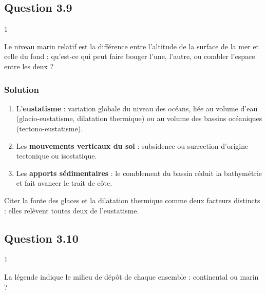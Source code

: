 \documentclass[11pt,a4paper]{article}
\providecommand{\tightlist}{\setlength{\itemsep}{0pt}\setlength{\parskip}{0pt}}
\begin{document}
\hypertarget{question-3.9}{%
\subsection{Question 3.9}\label{question-3.9}}

\begin{indication}{1}

Le niveau marin relatif est la différence entre l'altitude de la surface de la mer et celle du fond : qu'est-ce qui peut faire bouger l'une, l'autre, ou combler l'espace entre les deux ?

\end{indication}

\hypertarget{solution-36}{%
\subsubsection{Solution}\label{solution-36}}

\begin{enumerate}
\def\labelenumi{\arabic{enumi}.}
\tightlist
\item
  L'\textbf{eustatisme} : variation globale du niveau des océans, liée au volume d'eau (glacio-eustatisme, dilatation thermique) ou au volume des bassins océaniques (tectono-eustatisme).
\item
  Les \textbf{mouvements verticaux du sol} : subsidence ou surrection d'origine tectonique ou isostatique.
\item
  Les \textbf{apports sédimentaires} : le comblement du bassin réduit la bathymétrie et fait avancer le trait de côte.
\end{enumerate}

\begin{piege}

Citer la fonte des glaces et la dilatation thermique comme deux facteurs distincts : elles relèvent toutes deux de l'eustatisme.

\end{piege}

\hypertarget{question-3.10}{%
\subsection{Question 3.10}\label{question-3.10}}

\begin{indication}{1}

La légende indique le milieu de dépôt de chaque ensemble : continental ou marin ?

\end{indication}
\end{document}
